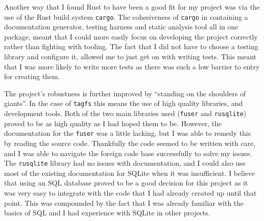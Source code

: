 Another way that I found Rust to have been a good fit for my project was via
the use of the Rust build system \texttt{cargo}. The cohesiveness of
\texttt{cargo} in containing a documentation generator, testing harness and
static analysis tool all in one package, meant that I could more easily focus
on developing the project correctly rather than fighting with tooling. The fact
that I did not have to choose a testing library and configure it, allowed me to
just get on with writing tests. This meant that I was more likely to write more
tests as there was such a low barrier to entry for creating them.

The project's robustness is further improved by ``standing on the shoulders of
giants''. In the case of \texttt{tagfs} this means the use of high quality
libraries, and development tools. Both of the two main libraries used
(\texttt{fuser} and \texttt{rusqlite}) proved to be as high quality as I had
hoped them to be. However, the documentation for the \texttt{fuser} was a
little lacking, but I was able to remedy this by reading the source code.
Thankfully the code seemed to be written with care, and I was able to navigate
the foreign code base successfully to solve my issues. The \texttt{rusqlite}
library had no issues with documentation, and I could also use most of the
existing documentation for SQLite when it was insufficient. I believe that
using an SQL database proved to be a good decision for this project as it was
very easy to integrate with the code that I had already created up until that
point. This was compounded by the fact that I was already familiar with the
basics of SQL and I had experience with SQLite in other projects.

